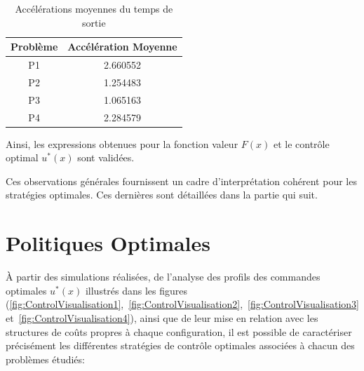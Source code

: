\begin{itemize}
    \begin{table}[htb]
        \centering
        \caption{Accélérations moyennes du temps de sortie}\label{tab:acceleration_results}
        \renewcommand{\arraystretch}{1.1}
        \begin{tabular}{||c|c||}
        \hline
        Problème & Accélération Moyenne \\\hline\hline
        P1 & 2.660552 \\
        P2 & 1.254483 \\
        P3 & 1.065163 \\
        P4 & 2.284579 \\
        \hline
        \end{tabular}
    \end{table}
\end{itemize}\FloatBarrier Ainsi, les expressions obtenues pour la fonction valeur $F(x)$ et le contrôle optimal $u^*(x)$ sont validées.

Ces observations générales fournissent un cadre d'interprétation cohérent pour les stratégies optimales. Ces dernières sont détaillées dans la partie qui suit.
\section{Politiques Optimales}
À partir des simulations réalisées, de l'analyse des profils des commandes optimales \( u^*(x) \) illustrés dans les figures (\ref{fig:ControlVisualisation1},~\ref{fig:ControlVisualisation2},~\ref{fig:ControlVisualisation3} et~\ref{fig:ControlVisualisation4}), ainsi que de leur mise en relation avec les structures de coûts propres à chaque configuration, il est possible de caractériser précisément les différentes stratégies de contrôle optimales associées à chacun des problèmes étudiés:

